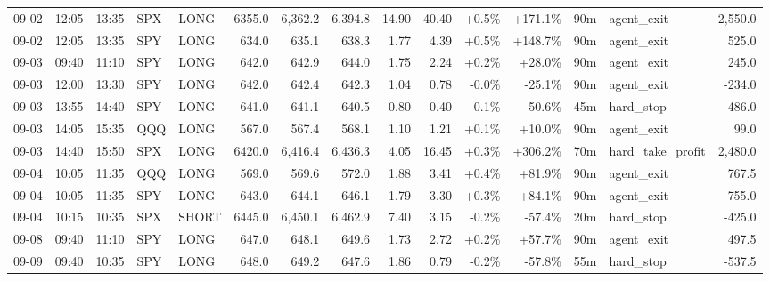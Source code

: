 \documentclass[11pt,a4paper,twoside]{article}
\begin{document}
\begin{landscape}
\begin{center}
\begin{longtable}{>{\color{txtmain}}l l l l l r r r r r r r r >{\color{txtmain}}l r}
09-02 & 12:05 & 13:35 & SPX & LONG & 6355.0 & 6,362.2 & 6,394.8 & 14.90 & 40.40 & \textcolor{wingreen}{+0.5\%} & \textcolor{wingreen}{+171.1\%} & 90m & agent\_exit & \textcolor{wingreen}{2,550.0} \\
09-02 & 12:05 & 13:35 & SPY & LONG & 634.0 & 635.1 & 638.3 & 1.77 & 4.39 & \textcolor{wingreen}{+0.5\%} & \textcolor{wingreen}{+148.7\%} & 90m & agent\_exit & \textcolor{wingreen}{525.0} \\
09-03 & 09:40 & 11:10 & SPY & LONG & 642.0 & 642.9 & 644.0 & 1.75 & 2.24 & \textcolor{wingreen}{+0.2\%} & \textcolor{wingreen}{+28.0\%} & 90m & agent\_exit & \textcolor{wingreen}{245.0} \\
09-03 & 12:00 & 13:30 & SPY & LONG & 642.0 & 642.4 & 642.3 & 1.04 & 0.78 & \textcolor{lossred}{-0.0\%} & \textcolor{lossred}{-25.1\%} & 90m & agent\_exit & \textcolor{lossred}{-234.0} \\
09-03 & 13:55 & 14:40 & SPY & LONG & 641.0 & 641.1 & 640.5 & 0.80 & 0.40 & \textcolor{lossred}{-0.1\%} & \textcolor{lossred}{-50.6\%} & 45m & hard\_stop & \textcolor{lossred}{-486.0} \\
09-03 & 14:05 & 15:35 & QQQ & LONG & 567.0 & 567.4 & 568.1 & 1.10 & 1.21 & \textcolor{wingreen}{+0.1\%} & \textcolor{wingreen}{+10.0\%} & 90m & agent\_exit & \textcolor{wingreen}{99.0} \\
09-03 & 14:40 & 15:50 & SPX & LONG & 6420.0 & 6,416.4 & 6,436.3 & 4.05 & 16.45 & \textcolor{wingreen}{+0.3\%} & \textcolor{wingreen}{+306.2\%} & 70m & hard\_take\_profit & \textcolor{wingreen}{2,480.0} \\
09-04 & 10:05 & 11:35 & QQQ & LONG & 569.0 & 569.6 & 572.0 & 1.88 & 3.41 & \textcolor{wingreen}{+0.4\%} & \textcolor{wingreen}{+81.9\%} & 90m & agent\_exit & \textcolor{wingreen}{767.5} \\
09-04 & 10:05 & 11:35 & SPY & LONG & 643.0 & 644.1 & 646.1 & 1.79 & 3.30 & \textcolor{wingreen}{+0.3\%} & \textcolor{wingreen}{+84.1\%} & 90m & agent\_exit & \textcolor{wingreen}{755.0} \\
09-04 & 10:15 & 10:35 & SPX & SHORT & 6445.0 & 6,450.1 & 6,462.9 & 7.40 & 3.15 & \textcolor{lossred}{-0.2\%} & \textcolor{lossred}{-57.4\%} & 20m & hard\_stop & \textcolor{lossred}{-425.0} \\
09-08 & 09:40 & 11:10 & SPY & LONG & 647.0 & 648.1 & 649.6 & 1.73 & 2.72 & \textcolor{wingreen}{+0.2\%} & \textcolor{wingreen}{+57.7\%} & 90m & agent\_exit & \textcolor{wingreen}{497.5} \\
09-09 & 09:40 & 10:35 & SPY & LONG & 648.0 & 649.2 & 647.6 & 1.86 & 0.79 & \textcolor{lossred}{-0.2\%} & \textcolor{lossred}{-57.8\%} & 55m & hard\_stop & \textcolor{lossred}{-537.5} \\

\end{longtable}
\end{center}
\end{landscape}
\end{document}
